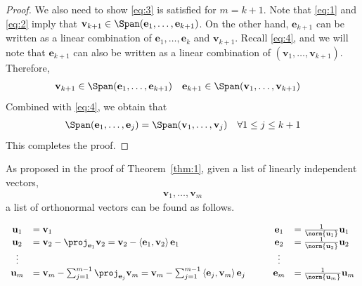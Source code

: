 \documentclass[thmcnt=section, color=blue, 12pt]{my-elegantbook}
\begin{document}
\begin{proof}
    \par We also need to show \eqref{eq:3} is satisfied for $m = k+1$. Note that \eqref{eq:1} and \eqref{eq:2} imply that $\mathbf{v}_{k+1} \in \Span(\mathbf{e}_1, \ldots, \mathbf{e}_{k+1})$. On the other hand, $\mathbf{e}_{k+1}$ can be written as a linear combination of $\mathbf{e}_1, \ldots, \mathbf{e}_k$ and $\mathbf{v}_{k+1}$. Recall \eqref{eq:4}, and we will note that $\mathbf{e}_{k+1}$ can also be written as a linear combination of $(\mathbf{v}_1, \ldots, \mathbf{v}_{k+1})$. Therefore, 
    \begin{align*}
        \mathbf{v}_{k+1} &\in \Span(\mathbf{e}_1, \ldots, \mathbf{e}_{k+1}) & 
        \mathbf{e}_{k+1} &\in \Span(\mathbf{v}_1, \ldots, \mathbf{v}_{k+1})
    \end{align*}
    Combined with \eqref{eq:4}, we obtain that 
    \begin{align*}
        \Span(\mathbf{e}_1, \ldots, \mathbf{e}_j)
        = \Span(\mathbf{v}_1, \ldots, \mathbf{v}_j)
        \quad \forall 1 \leq j \leq k+1
    \end{align*}
    This completes the proof.
\end{proof}


As proposed in the proof of Theorem~\ref{thm:1}, given a list of linearly independent vectors,
\begin{align*}
    \mathbf{v}_1, \ldots, \mathbf{v}_m
\end{align*}
a list of orthonormal vectors can be found as follows.

\begin{align}
    \begin{array}{clccl}
        \mathbf{u}_1 &= \mathbf{v}_1
        &\quad
        &\mathbf{e}_1 &= \frac{1}{\norm{\mathbf{u}_1}} \mathbf{u}_1 \\ 
        \mathbf{u}_2 &= \mathbf{v}_2 - \proj_{\mathbf{e}_1} \mathbf{v}_2
        = \mathbf{v}_2 - \left\langle \mathbf{e}_1, \mathbf{v}_2 \right\rangle \mathbf{e}_1
        &\quad
        &\mathbf{e}_2 &= \frac{1}{\norm{\mathbf{u}_2}} \mathbf{u}_2 \\ 
        \vdots&&&\vdots\\
        \mathbf{u}_m &= \mathbf{v}_m - \sum_{j=1}^{m-1} \proj_{\mathbf{e}_j} \mathbf{v}_m
        = \mathbf{v}_m - \sum_{j=1}^{m-1} \left\langle \mathbf{e}_j, \mathbf{v}_m \right\rangle \mathbf{e}_j
        &\quad
        &\mathbf{e}_m &= \frac{1}{\norm{\mathbf{u}_m}} \mathbf{u}_m
    \end{array}
    \label{eq:5}
\end{align}
\end{document}
